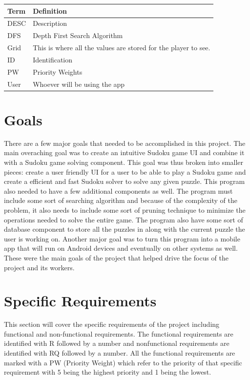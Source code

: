 \documentclass{article}
\begin{document}
\begin{tabular}{ | m{8em} | m{24em}|  } 
\hline
\textbf{Term}& \textbf{Definition}  \\ 
\hline
DESC & Description  \\ 
\hline
DFS & Depth First Search Algorithm\\
\hline
Grid & This is where all the values are stored for the player to see.  \\ 
\hline
ID & Identification  \\ 
\hline
PW & Priority Weights  \\ 
\hline
User & Whoever will be using the app  \\ 
\hline
\end{tabular}

 

\section{Goals}
There are a few major goals that needed to be accomplished in this project. The main overaching goal was to create an intuitive Sudoku game UI and combine it with a Sudoku game solving component. This goal was thus broken into smaller pieces: create a user friendly UI for a user to be able to play a Sudoku game and create a efficient and fast Sudoku solver to solve any given puzzle. This program also needed to have a few additional components as well. The program must include some sort of searching algorithm and because of the complexity of the problem, it also needs to include some sort of pruning technique to minimize the operations needed to solve the entire game. The program also have some sort of database component to store all the puzzles in along with the current puzzle the user is working on. Another major goal was to turn this program into a mobile app that will run on Android devices and eventually on other systems as well. These were the main goals of the project that helped drive the focus of the project and its workers.

 
\section{Specific Requirements}
This section will cover the specific requirements of the project including functional and non-functional requirements. The functional requirements are identified with R followed by a number and nonfunctional requirements are identified with RQ followed by a number. All the functional requirements are marked with a PW (Priority Weight) which refer to the priority of that specific requirement with 5 being the highest priority and 1 being the lowest.
\end{document}
